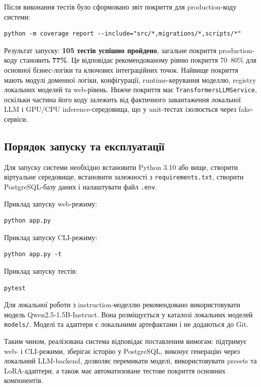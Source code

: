Після виконання тестів було сформовано звіт покриття для production-коду системи:

\begin{lstlisting}[style=plantumlstyle]
python -m coverage report --include="src/*,migrations/*,scripts/*"
\end{lstlisting}

Результат запуску: \textbf{105 тестів успішно пройдено}, загальне покриття production-коду становить \textbf{77\%}. Це відповідає рекомендованому рівню покриття 70--80\% для основної бізнес-логіки та ключових інтеграційних точок. Найвище покриття мають модулі доменної логіки, конфігурації, runtime-керування моделлю, registry локальних моделей та web-рівень. Нижче покриття має \texttt{TransformersLLMService}, оскільки частина його коду залежить від фактичного завантаження локальної LLM і GPU/CPU inference-середовища, що у unit-тестах ізолюється через fake-сервіси.

\subsection{Порядок запуску та експлуатації}

Для запуску системи необхідно встановити Python 3.10 або вище, створити віртуальне середовище, встановити залежності з \texttt{requirements.txt}, створити PostgreSQL-базу даних і налаштувати файл \texttt{.env}.

Приклад запуску web-режиму:
\begin{lstlisting}[style=plantumlstyle]
python app.py
\end{lstlisting}

Приклад запуску CLI-режиму:
\begin{lstlisting}[style=plantumlstyle]
python app.py -t
\end{lstlisting}

Приклад запуску тестів:
\begin{lstlisting}[style=plantumlstyle]
pytest
\end{lstlisting}

Для локальної роботи з instruction-моделлю рекомендовано використовувати модель Qwen2.5-1.5B-Instruct. Вона розміщується у каталозі локальних моделей \texttt{models/}. Моделі та адаптери є локальними артефактами і не додаються до Git.

Таким чином, реалізована система відповідає поставленим вимогам: підтримує web- і CLI-режими, зберігає історію у PostgreSQL, виконує генерацію через локальний LLM-backend, дозволяє перемикати моделі, використовувати presets та LoRA-адаптери, а також має автоматизоване тестове покриття основних компонентів.

\newpage
